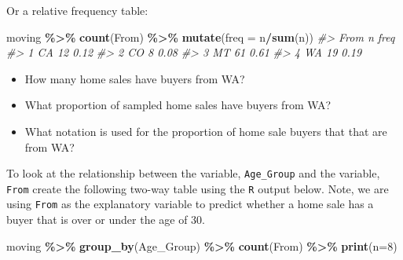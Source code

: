 \documentclass[
]{report}
\newenvironment{Shaded}{\begin{snugshade}}{\end{snugshade}}
\newcommand{\AttributeTok}[1]{\textcolor[rgb]{0.13,0.29,0.53}{#1}}
\newcommand{\CommentTok}[1]{\textcolor[rgb]{0.56,0.35,0.01}{\textit{#1}}}
\newcommand{\DecValTok}[1]{\textcolor[rgb]{0.00,0.00,0.81}{#1}}
\newcommand{\FunctionTok}[1]{\textcolor[rgb]{0.13,0.29,0.53}{\textbf{#1}}}
\newcommand{\NormalTok}[1]{#1}
\newcommand{\SpecialCharTok}[1]{\textcolor[rgb]{0.81,0.36,0.00}{\textbf{#1}}}
\providecommand{\tightlist}{%
  \setlength{\itemsep}{0pt}\setlength{\parskip}{0pt}}
\begin{document}
Or a relative frequency table:

\begin{Shaded}
\begin{Highlighting}[]
\NormalTok{moving }\SpecialCharTok{\%\textgreater{}\%}
  \FunctionTok{count}\NormalTok{(From) }\SpecialCharTok{\%\textgreater{}\%}
  \FunctionTok{mutate}\NormalTok{(}\AttributeTok{freq =}\NormalTok{ n}\SpecialCharTok{/}\FunctionTok{sum}\NormalTok{(n))}
\CommentTok{\#\textgreater{}   From  n freq}
\CommentTok{\#\textgreater{} 1   CA 12 0.12}
\CommentTok{\#\textgreater{} 2   CO  8 0.08}
\CommentTok{\#\textgreater{} 3   MT 61 0.61}
\CommentTok{\#\textgreater{} 4   WA 19 0.19}
\end{Highlighting}
\end{Shaded}

\begin{itemize}
\tightlist
\item
  How many home sales have buyers from WA?
\end{itemize}

\vspace{0.3in}

\begin{itemize}
\tightlist
\item
  What proportion of sampled home sales have buyers from WA?
\end{itemize}

\vspace{0.3in}

\begin{itemize}
\tightlist
\item
  What notation is used for the proportion of home sale buyers that that are from WA?
\end{itemize}

\vspace{0.3in}

\newpage

To look at the relationship between the variable, \texttt{Age\_Group} and the variable, \texttt{From} create the following two-way table using the \texttt{R} output below. Note, we are using \texttt{From} as the explanatory variable to predict whether a home sale has a buyer that is over or under the age of 30.

\begin{Shaded}
\begin{Highlighting}[]
\NormalTok{moving }\SpecialCharTok{\%\textgreater{}\%}
    \FunctionTok{group\_by}\NormalTok{(Age\_Group) }\SpecialCharTok{\%\textgreater{}\%} \FunctionTok{count}\NormalTok{(From) }\SpecialCharTok{\%\textgreater{}\%} \FunctionTok{print}\NormalTok{(}\AttributeTok{n=}\DecValTok{8}\NormalTok{)}
\end{Highlighting}
\end{Shaded}
\end{document}
